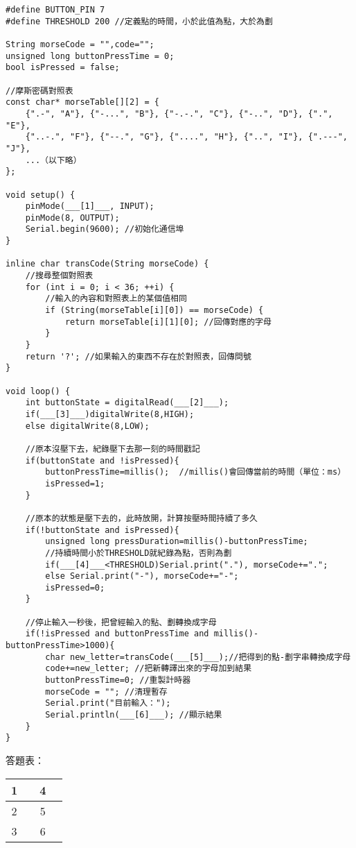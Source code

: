 \documentclass[12pt,a4paper]{article}
\begin{document}
\begin{lstlisting}
#define BUTTON_PIN 7
#define THRESHOLD 200 //定義點的時間，小於此值為點，大於為劃

String morseCode = "",code="";
unsigned long buttonPressTime = 0;
bool isPressed = false;

//摩斯密碼對照表
const char* morseTable[][2] = {
    {".-", "A"}, {"-...", "B"}, {"-.-.", "C"}, {"-..", "D"}, {".", "E"},
    {"..-.", "F"}, {"--.", "G"}, {"....", "H"}, {"..", "I"}, {".---", "J"},
    ...（以下略）
};

void setup() {
    pinMode(___[1]___, INPUT);
    pinMode(8, OUTPUT);
    Serial.begin(9600); //初始化通信埠
}

inline char transCode(String morseCode) {
    //搜尋整個對照表
    for (int i = 0; i < 36; ++i) {
        //輸入的內容和對照表上的某個值相同
        if (String(morseTable[i][0]) == morseCode) {
            return morseTable[i][1][0]; //回傳對應的字母
        }
    }
    return '?'; //如果輸入的東西不存在於對照表，回傳問號
}

void loop() {
    int buttonState = digitalRead(___[2]___);
    if(___[3]___)digitalWrite(8,HIGH);
    else digitalWrite(8,LOW);

    //原本沒壓下去，紀錄壓下去那一刻的時間戳記
    if(buttonState and !isPressed){
        buttonPressTime=millis();  //millis()會回傳當前的時間（單位：ms）
        isPressed=1;
    }
    
    //原本的狀態是壓下去的，此時放開，計算按壓時間持續了多久
    if(!buttonState and isPressed){
        unsigned long pressDuration=millis()-buttonPressTime;
        //持續時間小於THRESHOLD就紀錄為點，否則為劃
        if(___[4]___<THRESHOLD)Serial.print("."), morseCode+=".";
        else Serial.print("-"), morseCode+="-";
        isPressed=0;
    }
    
    //停止輸入一秒後，把曾經輸入的點、劃轉換成字母
    if(!isPressed and buttonPressTime and millis()-buttonPressTime>1000){
        char new_letter=transCode(___[5]___);//把得到的點-劃字串轉換成字母
        code+=new_letter; //把新轉譯出來的字母加到結果
        buttonPressTime=0; //重製計時器
        morseCode = ""; //清理暫存
        Serial.print("目前輸入：");
        Serial.println(___[6]___); //顯示結果
    }
}
\end{lstlisting}

答題表：
\begin{table}[h!]
\centering
\begin{tabular}{|c|p{7cm}|c|p{7cm}|}
\hline
1 &  & 4 & \\ \hline
2 &  & 5 & \\ \hline
3 &  & 6 & \\ \hline
\end{tabular}
\end{table}
\end{document}
